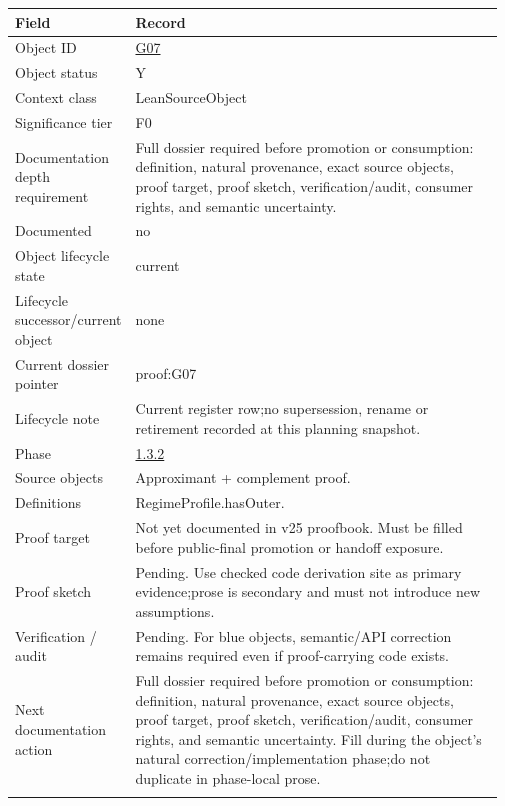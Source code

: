 \begin{longtable}{L{0.16\linewidth} L{0.81\linewidth}}
\hline
\textbf{Field} & \textbf{Record}\\
\hline
Object ID & \hyperlink{object-row-G07}{G07}\\
\hline\addlinespace[0.20em]
Object status & Y\\
\hline\addlinespace[0.20em]
Context class & LeanSourceObject\\
\hline\addlinespace[0.20em]
Significance tier & F0\\
\hline\addlinespace[0.20em]
Documentation depth requirement & Full dossier required before promotion or consumption: definition, natural provenance, exact source objects, proof target, proof sketch, verification/\allowbreak{}audit, consumer rights, and semantic uncertainty.\\
\hline\addlinespace[0.20em]
Documented & no\\
\hline\addlinespace[0.20em]
Object lifecycle state & current\\
\hline\addlinespace[0.20em]
Lifecycle successor/\allowbreak{}current object & none\\
\hline\addlinespace[0.20em]
Current dossier pointer & proof:G07\\
\hline\addlinespace[0.20em]
Lifecycle note & Current register row;\newline no supersession, rename or retirement recorded at this planning snapshot.\\
\hline\addlinespace[0.20em]
Phase & \hyperlink{phase-row-1-3-2}{1.3.2}\\
\hline\addlinespace[0.20em]
Source objects & Approximant + complement proof.\\
\hline\addlinespace[0.20em]
Definitions & RegimeProfile.hasOuter.\\
\hline\addlinespace[0.20em]
Proof target & Not yet documented in v25 proofbook. Must be filled before public-final promotion or handoff exposure.\\
\hline\addlinespace[0.20em]
Proof sketch & Pending. Use checked code derivation site as primary evidence;\newline prose is secondary and must not introduce new assumptions.\\
\hline\addlinespace[0.20em]
Verification /\allowbreak{} audit & Pending. For blue objects, semantic/\allowbreak{}API correction remains required even if proof-carrying code exists.\\
\hline\addlinespace[0.20em]
Next documentation action & Full dossier required before promotion or consumption: definition, natural provenance, exact source objects, proof target, proof sketch, verification/\allowbreak{}audit, consumer rights, and semantic uncertainty. Fill during the object's natural correction/\allowbreak{}implementation phase;\newline do not duplicate in phase-local prose.\\
\hline\addlinespace[0.20em]
\end{longtable}
